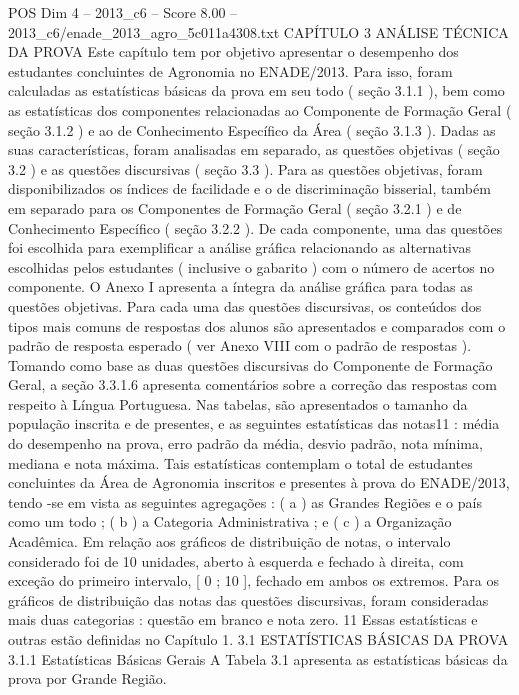 \begin{textsample}{POS Dim 4 – 2013\_c6 – Score 8.00 – 2013\_c6/enade\_2013\_agro\_5c011a4308.txt}  \label{ex:f4_pos_044}
CAPÍTULO 3 ANÁLISE TÉCNICA DA PROVA Este capítulo tem por objetivo apresentar o desempenho dos estudantes concluintes de Agronomia no ENADE/2013.
Para isso, foram calculadas as estatísticas básicas da prova em seu todo ( seção 3.1.1 ), bem como as estatísticas dos componentes relacionadas ao Componente de Formação Geral ( seção 3.1.2 ) e ao de Conhecimento Específico da Área ( seção 3.1.3 ).
Dadas as suas características, foram analisadas em separado, as questões objetivas ( seção 3.2 ) e as questões discursivas ( seção 3.3 ).
Para as questões objetivas, foram disponibilizados os índices de facilidade e o de discriminação bisserial, também em separado para os Componentes de Formação Geral ( seção 3.2.1 ) e de Conhecimento Específico ( seção 3.2.2 ).
De cada componente, uma das questões foi escolhida para exemplificar a análise gráfica relacionando as alternativas escolhidas pelos estudantes ( inclusive o gabarito ) com o número de acertos no componente.
O Anexo I apresenta a íntegra da análise gráfica para todas as questões objetivas.
Para cada uma das questões discursivas, os conteúdos dos tipos mais comuns de respostas dos alunos são apresentados e comparados com o padrão de resposta esperado ( ver Anexo VIII com o padrão de respostas ).
Tomando como base as duas questões discursivas do Componente de Formação Geral, a seção 3.3.1.6 apresenta comentários sobre a correção das respostas com respeito à Língua Portuguesa.
Nas tabelas, são apresentados o tamanho da população inscrita e de presentes, e as seguintes estatísticas das notas11 : média do desempenho na prova, erro padrão da média, desvio padrão, nota mínima, mediana e nota máxima.
Tais estatísticas contemplam o total de estudantes concluintes da Área de Agronomia inscritos e presentes à prova do ENADE/2013, tendo -se em vista as seguintes agregações : ( a ) as Grandes Regiões e o país como um todo ; ( b ) a Categoria Administrativa ; e ( c ) a Organização Acadêmica.
Em relação aos gráficos de distribuição de notas, o intervalo considerado foi de 10 unidades, aberto à esquerda e fechado à direita, com exceção do primeiro intervalo, [ 0 ; 10 ], fechado em ambos os extremos.
Para os gráficos de distribuição das notas das questões discursivas, foram consideradas mais duas categorias : questão em branco e nota zero. 11 Essas estatísticas e outras estão definidas no Capítulo 1. 3.1 ESTATÍSTICAS BÁSICAS DA PROVA 3.1.1 Estatísticas Básicas Gerais A Tabela 3.1 apresenta as estatísticas básicas da prova por Grande Região.

\end{textsample}
